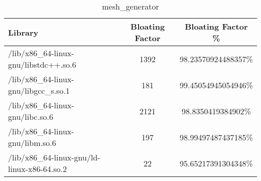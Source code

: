 \begin{table}[h]

\centering
\caption{mesh\_generator}
\footnotesize
\begin{tabular}{l|c|c}
\toprule
Library & Bloating Factor & Bloating Factor \% \\ \midrule
\colorbox{gray!20}{/lib/x86\_64-linux-gnu/libstdc++.so.6} & 1392 & 98.23570924488357\% \\ \hline
\colorbox{gray!20}{/lib/x86\_64-linux-gnu/libgcc\_s.so.1} & 181 & 99.45054945054946\% \\ \hline
\colorbox{gray!20}{/lib/x86\_64-linux-gnu/libc.so.6} & 2121 & 98.8350419384902\% \\ \hline
\colorbox{gray!20}{/lib/x86\_64-linux-gnu/libm.so.6} & 197 & 98.99497487437185\% \\ \hline
/lib/x86\_64-linux-gnu/ld-linux-x86-64.so.2 & 22 & 95.65217391304348\% \\ \hline
\bottomrule
\end{tabular}
\end{table}

